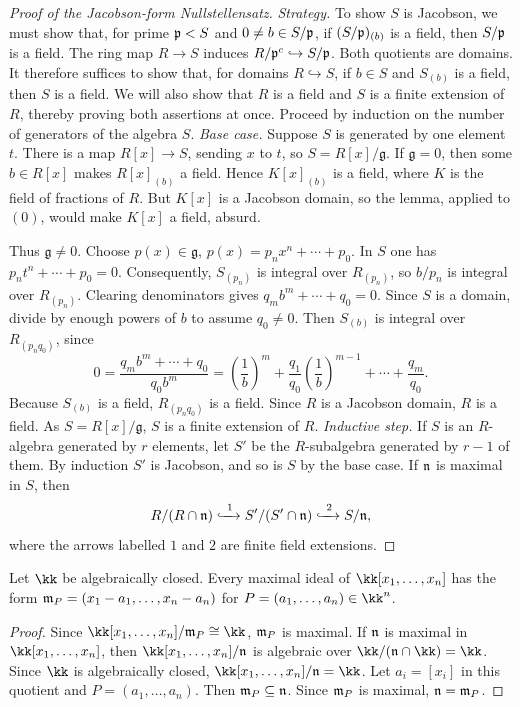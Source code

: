 \documentclass[11pt,a4paper]{article}
\begin{document}
\begin{proof}[Proof of the Jacobson-form Nullstellensatz]
\emph{Strategy.} To show $S$ is Jacobson, we must show that, for prime $\mathfrak p<S$ and $0\ne b\in S/\mathfrak p$, if $(S/\mathfrak p)_{(b)}$ is a field, then $S/\mathfrak p$ is a field. The ring map $R\to S$ induces $R/\mathfrak p^c\hookrightarrow S/\mathfrak p$. Both quotients are domains. It therefore suffices to show that, for domains $R\hookrightarrow S$, if $b\in S$ and $S_{(b)}$ is a field, then $S$ is a field. We will also show that $R$ is a field and $S$ is a finite extension of $R$, thereby proving both assertions at once. Proceed by induction on the number of generators of the algebra $S$.
\emph{Base case.} Suppose $S$ is generated by one element $t$. There is a map $R[x]\to S$, sending $x$ to $t$, so $S=R[x]/\mathfrak g$. If $\mathfrak g=0$, then some $b\in R[x]$ makes $R[x]_{(b)}$ a field. Hence $K[x]_{(b)}$ is a field, where $K$ is the field of fractions of $R$. But $K[x]$ is a Jacobson domain, so the lemma, applied to $(0)$, would make $K[x]$ a field, absurd.

Thus $\mathfrak g\ne0$. Choose $p(x)\in\mathfrak g$, $p(x)=p_nx^n+\cdots+p_0$. In $S$ one has $p_nt^n+\cdots+p_0=0$. Consequently, $S_{(p_n)}$ is integral over $R_{(p_n)}$, so $b/p_n$ is integral over $R_{(p_n)}$. Clearing denominators gives $q_mb^m+\cdots+q_0=0$. Since $S$ is a domain, divide by enough powers of $b$ to assume $q_0\ne0$. Then $S_{(b)}$ is integral over $R_{(p_nq_0)}$, since
\[
0=\frac{q_mb^m+\cdots+q_0}{q_0b^m}
=\left(\frac1b\right)^m+\frac{q_1}{q_0}\left(\frac1b\right)^{m-1}+\cdots+\frac{q_m}{q_0}.
\]
Because $S_{(b)}$ is a field, $R_{(p_nq_0)}$ is a field. Since $R$ is a Jacobson domain, $R$ is a field. As $S=R[x]/\mathfrak g$, $S$ is a finite extension of $R$.
\emph{Inductive step.} If $S$ is an $R$-algebra generated by $r$ elements, let $S'$ be the $R$-subalgebra generated by $r-1$ of them. By induction $S'$ is Jacobson, and so is $S$ by the base case. If $\mathfrak n$ is maximal in $S$, then
\[
R/(R\cap\nn)\xhookrightarrow{\ 1\ }S'/(S'\cap\nn)
\xhookrightarrow{\ 2\ }S/\nn,
\]
where the arrows labelled $1$ and $2$ are finite field extensions.
\end{proof}
\setcounter{theorem}{27}\begin{corollary}
Let $\kk$ be algebraically closed. Every maximal ideal of $\kk[x_1,\ldots,x_n]$ has the form $\mathfrak m_P=(x_1-a_1,\ldots,x_n-a_n)$ for $P=(a_1,\ldots,a_n)\in\kk^n$.
\end{corollary}
\begin{proof}
Since $\kk[x_1,\ldots,x_n]/\mm_P\cong\kk$, $\mathfrak m_P$ is maximal. If $\mathfrak n$ is maximal in $\kk[x_1,\ldots,x_n]$, then $\kk[x_1,\ldots,x_n]/\nn$ is algebraic over $\kk/(\nn\cap\kk)=\kk$. Since $\kk$ is algebraically closed, $\kk[x_1,\ldots,x_n]/\nn=\kk$. Let $a_i=[x_i]$ in this quotient and $P=(a_1,\ldots,a_n)$. Then $\mathfrak m_P\subseteq\mathfrak n$. Since $\mathfrak m_P$ is maximal, $\mathfrak n=\mathfrak m_P$.
\end{proof}
\end{document}
